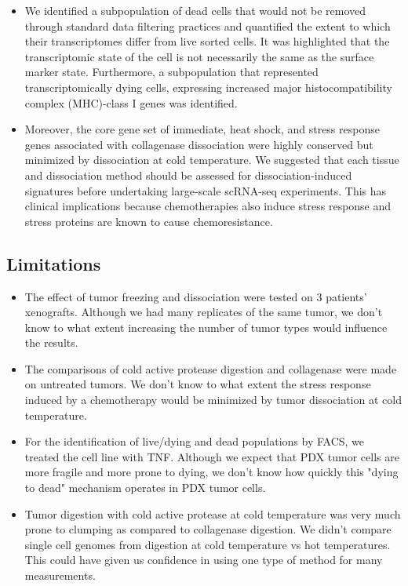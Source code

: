 \begin{itemize}
 \item We identified a subpopulation of dead cells that would not be removed through standard data filtering practices and quantified the extent to which their transcriptomes differ from live sorted cells. It was highlighted that the transcriptomic state of the cell is not necessarily the same as the surface marker state. Furthermore, a subpopulation that represented transcriptomically dying cells, expressing increased major histocompatibility complex (MHC)-class I genes was identified. 
 
 \item  Moreover, the core gene set of immediate, heat shock, and stress response genes associated with collagenase dissociation were highly conserved but minimized by dissociation at cold temperature. We suggested that each tissue and dissociation method should be assessed for dissociation-induced signatures before undertaking large-scale scRNA-seq experiments. This has clinical implications because chemotherapies also induce stress response and stress proteins are known to cause chemoresistance.


\end{itemize}

\subsection{Limitations}

\begin{itemize}

\item The effect of tumor freezing and dissociation were tested on 3 patients' xenografts. Although we had many replicates of the same tumor, we don't know to what extent increasing the number of tumor types would influence the results.

\item The comparisons of cold active protease digestion and collagenase were made on untreated tumors. We don't know to what extent the stress response induced by a chemotherapy would be minimized by tumor dissociation at cold temperature.

\item For the identification of live/dying and dead populations by FACS, we treated the cell line with TNF\textalpha. Although we expect that PDX tumor cells are more fragile and more prone to dying, we don't know how quickly this "dying to dead" mechanism operates in PDX tumor cells. 

\item Tumor digestion with cold active protease at cold temperature was very much prone to clumping as compared to collagenase digestion. We didn't compare single cell genomes from digestion at cold temperature vs hot temperatures. This could have given us confidence in using one type of method for many measurements.


\end{itemize}

